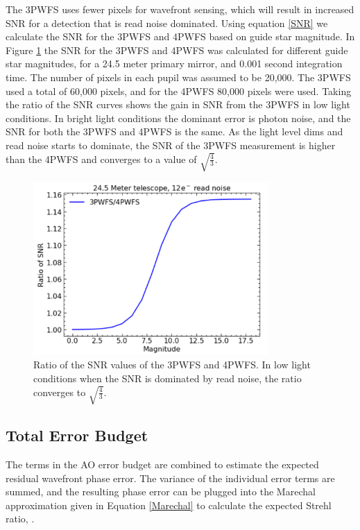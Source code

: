 The 3PWFS uses fewer pixels for wavefront sensing, which will result in increased SNR for a detection that is read noise dominated. Using equation \ref{SNR} we calculate the SNR for the 3PWFS and 4PWFS based on guide star magnitude. In Figure \ref{fig:SNRcurve} the SNR for the 3PWFS and 4PWFS was calculated for different guide star magnitudes, for a 24.5 meter primary mirror, and 0.001 second integration time. The number of pixels in each pupil was assumed to be 20,000. The 3PWFS used a total of 60,000 pixels, and for the 4PWFS 80,000 pixels were used. Taking the ratio of the SNR curves shows the gain in SNR from the 3PWFS in low light conditions. In bright light conditions the dominant error is photon noise, and the SNR for both the 3PWFS and 4PWFS is the same. As the light level dims and read noise starts to dominate, the SNR of the 3PWFS measurement is higher than the 4PWFS and converges to a value of $\sqrt{\frac{4}{3}}$.

\begin{figure}
    \centering
    \includegraphics[width=0.8\textwidth]{Chapter Materials/Chapter Two Materials/SNRcurve.png}
    \caption{Ratio of the SNR values of the 3PWFS and 4PWFS. In low light conditions when the SNR is dominated by read noise, the ratio converges to $\sqrt{\frac{4}{3}}$.}
    \label{fig:SNRcurve}
\end{figure}
\subsection{Total Error Budget}

The terms in the AO error budget are combined to estimate the expected residual wavefront phase error. The variance of the individual error terms are summed, and the resulting phase error can be plugged into the Marechal approximation given in Equation \ref{Marechal} to calculate the expected Strehl ratio, \citep{hardy}.

